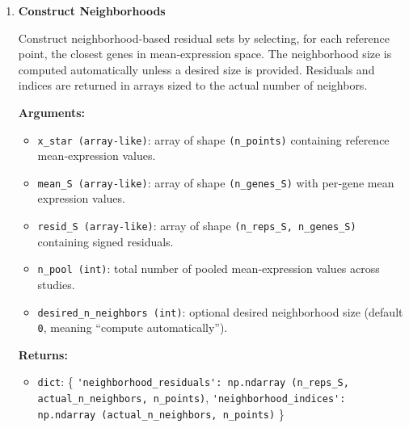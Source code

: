 \begin{enumerate}
        \textbf{Returns:}
        \begin{itemize}
            \item \lstinline!int!: computed neighborhood size.
        \end{itemize}

        \begin{lstlisting}[language=Python, caption={Neighborhood Size Computation}]
n_neighbors = tox_calc_neighborhood_size(
    n_pool,
    n_points,
    n_genes_S,
    mean_S,
    desired_size=0
)
        \end{lstlisting}

    \item \textbf{Construct Neighborhoods}

        Construct neighborhood‑based residual sets by selecting, for each reference point, the closest genes in mean‑expression space.  
        The neighborhood size is computed automatically unless a desired size is provided.  
        Residuals and indices are returned in arrays sized to the actual number of neighbors.

        \textbf{Arguments:}
        \begin{itemize}
            \item \lstinline!x_star (array-like)!: array of shape \lstinline!(n_points)! containing reference mean‑expression values.
            \item \lstinline!mean_S (array-like)!: array of shape \lstinline!(n_genes_S)! with per‑gene mean expression values.
            \item \lstinline!resid_S (array-like)!: array of shape \lstinline!(n_reps_S, n_genes_S)! containing signed residuals.
            \item \lstinline!n_pool (int)!: total number of pooled mean‑expression values across studies.
            \item \lstinline!desired_n_neighbors (int)!: optional desired neighborhood size (default \lstinline!0!, meaning “compute automatically”).
        \end{itemize}

        \textbf{Returns:}
        \begin{itemize}
            \item \lstinline!dict!: \{
                \lstinline!'neighborhood_residuals': np.ndarray (n_reps_S, actual_n_neighbors, n_points)!,  
                \lstinline!'neighborhood_indices': np.ndarray (actual_n_neighbors, n_points)!
            \}
        \end{itemize}


\end{enumerate}
